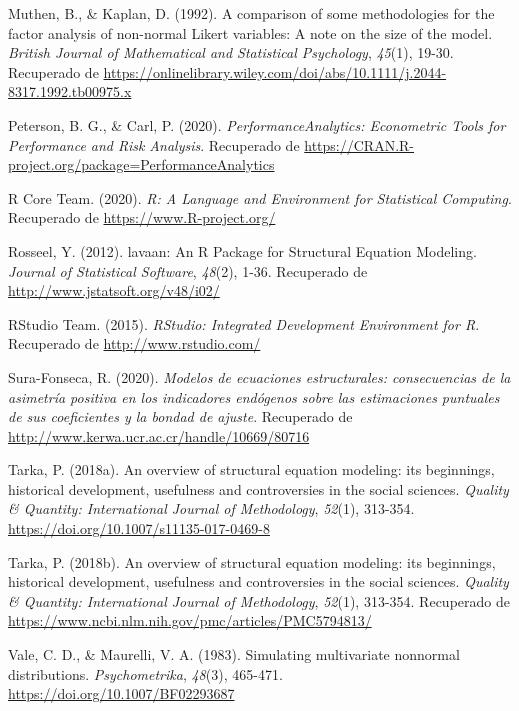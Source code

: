 \documentclass[
  english]{revcoles}
\begin{document}
\leavevmode\hypertarget{ref-muthen}{}%
Muthen, B., \& Kaplan, D. (1992). A comparison of some methodologies for
the factor analysis of non-normal Likert variables: A note on the size
of the model. \emph{British Journal of Mathematical and Statistical
Psychology}, \emph{45}(1), 19-30. Recuperado de
\url{https://onlinelibrary.wiley.com/doi/abs/10.1111/j.2044-8317.1992.tb00975.x}

\leavevmode\hypertarget{ref-PerformanceAnalytics}{}%
Peterson, B. G., \& Carl, P. (2020). \emph{PerformanceAnalytics:
Econometric Tools for Performance and Risk Analysis}. Recuperado de
\url{https://CRAN.R-project.org/package=PerformanceAnalytics}

\leavevmode\hypertarget{ref-R}{}%
R Core Team. (2020). \emph{R: A Language and Environment for Statistical
Computing}. Recuperado de \url{https://www.R-project.org/}

\leavevmode\hypertarget{ref-lavaan}{}%
Rosseel, Y. (2012). lavaan: An R Package for Structural Equation
Modeling. \emph{Journal of Statistical Software}, \emph{48}(2), 1-36.
Recuperado de \url{http://www.jstatsoft.org/v48/i02/}

\leavevmode\hypertarget{ref-RStudio}{}%
RStudio Team. (2015). \emph{RStudio: Integrated Development Environment
for R}. Recuperado de \url{http://www.rstudio.com/}

\leavevmode\hypertarget{ref-sura}{}%
Sura-Fonseca, R. (2020). \emph{Modelos de ecuaciones estructurales:
consecuencias de la asimetría positiva en los indicadores endógenos
sobre las estimaciones puntuales de sus coeficientes y la bondad de
ajuste}. Recuperado de
\url{http://www.kerwa.ucr.ac.cr/handle/10669/80716}

\leavevmode\hypertarget{ref-tarka}{}%
Tarka, P. (2018a). An overview of structural equation modeling: its
beginnings, historical development, usefulness and controversies in the
social sciences. \emph{Quality \& Quantity: International Journal of
Methodology}, \emph{52}(1), 313-354.
\url{https://doi.org/10.1007/s11135-017-0469-8}

\leavevmode\hypertarget{ref-Tarka}{}%
Tarka, P. (2018b). An overview of structural equation modeling: its
beginnings, historical development, usefulness and controversies in the
social sciences. \emph{Quality \& Quantity: International Journal of
Methodology}, \emph{52}(1), 313-354. Recuperado de
\url{https://www.ncbi.nlm.nih.gov/pmc/articles/PMC5794813/}

\leavevmode\hypertarget{ref-Vale1983}{}%
Vale, C. D., \& Maurelli, V. A. (1983). Simulating multivariate
nonnormal distributions. \emph{Psychometrika}, \emph{48}(3), 465-471.
\url{https://doi.org/10.1007/BF02293687}
\end{document}
